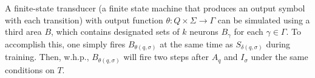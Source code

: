 \documentclass[12pt,nosubfloats]{alt2024} %
\newcommand{\1}{\mathbbm{1}}
\begin{document}



\begin{remark} A finite-state transducer (a finite state machine that produces an output symbol with each transition) with output function $\theta \colon Q \times \Sigma \to \Gamma$ can be simulated using a third area $B$, which contains designated sets of $k$ neurons $B_\gamma$ for each $\gamma \in \Gamma$. To accomplish this, one simply fires $B_{\theta(q, \sigma)}$ at the same time as $S_{\delta(q, \sigma)}$ during training. Then, w.h.p., $B_{\theta(q, \sigma)}$ will fire two steps after $A_q$ and $I_\sigma$ under the same conditions on $T$.
\end{remark}
\end{document}
